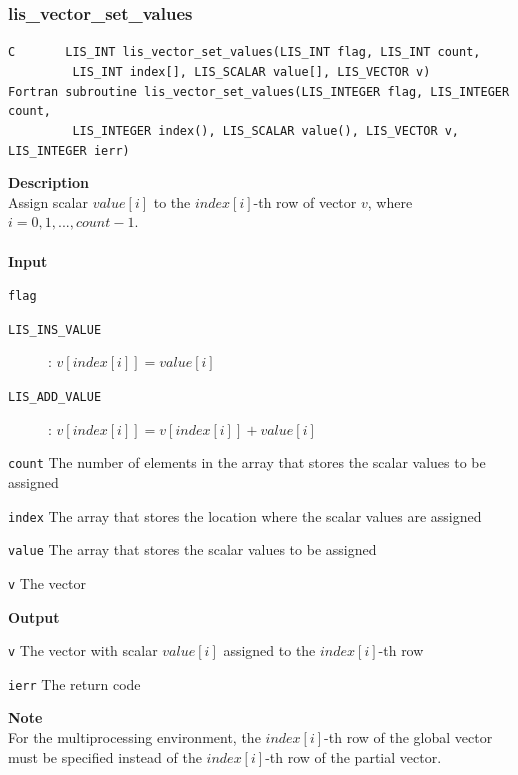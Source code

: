 \documentclass[a4paper]{article}
\newcommand{\namelistlabel}[1]{\mbox{#1}\hfill}
\newenvironment{namelist}[1]{%
\begin{list}{}
  {\let\makelabel\namelistlabel
  \settowidth{\labelwidth}{#1}
  \setlength{\leftmargin}{1.1\labelwidth}}
  }{%
\end{list}}
\begin{document}
\subsubsection{lis\_vector\_set\_values}
\begin{screen}
\verb|C       LIS_INT lis_vector_set_values(LIS_INT flag, LIS_INT count,|\\
\verb|         LIS_INT index[], LIS_SCALAR value[], LIS_VECTOR v)|\\
\verb|Fortran subroutine lis_vector_set_values(LIS_INTEGER flag, LIS_INTEGER count,|\\
\verb|         LIS_INTEGER index(), LIS_SCALAR value(), LIS_VECTOR v, LIS_INTEGER ierr)|
\end{screen}
{\bf Description}\\
\indent
Assign scalar $value[i]$ to the $index[i]$-th row of
vector $v$, where $i=0,1,...,count-1$.
\\ \\
\noindent
{\bf Input}
\begin{namelist}{XXXXXXXXXXXXXXXXXXXX}
\item[\tt flag] \begin{description}
\item[\tt LIS\_INS\_VALUE]: $v[index[i]] = value[i]$
\item[\tt LIS\_ADD\_VALUE]: $v[index[i]] = v[index[i]] + value[i]$
\end{description}
\item[\tt count] The number of elements in the array that stores
		the scalar values to be assigned
\item[\tt index] The array that stores the location where the scalar values are assigned
\item[\tt value] The array that stores the scalar values to be assigned
\item[\tt v] The vector
\end{namelist}
{\bf Output}
\begin{namelist}{XXXXXXXXXXXXXXXXXXXX}
\item[\tt v] The vector with scalar $value[i]$ assigned to the $index[i]$-th row
\item[\tt ierr] The return code
\end{namelist}
{\bf Note}\\
\indent
For the multiprocessing environment, the $index[i]$-th row of the global vector must be specified instead 
of the $index[i]$-th row of the partial vector.

\newpage
\end{document}
